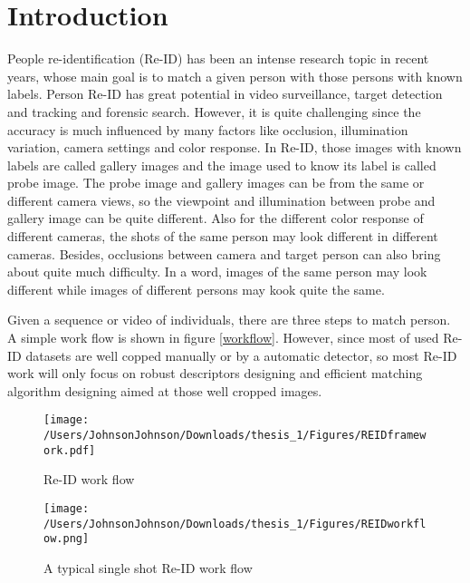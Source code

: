 \chapter{Introduction}

People re-identification (Re-ID) has been an intense research topic in recent years, whose main goal is to match a given person with those persons with known labels. Person Re-ID has great potential in video surveillance, target detection and tracking and forensic search. However, it is quite challenging since the accuracy is much influenced by many factors like occlusion, illumination variation, camera settings and color response. In Re-ID, those images with known labels are called gallery images and the image used to know its label is called probe image. The probe image and gallery images can be from the same or different camera views, so the viewpoint and illumination between probe and gallery image can be quite different. Also for the different color response of different cameras, the shots of the same person may look different in different cameras. Besides, occlusions between camera and target person can also bring about quite much difficulty.  In a word, images of the same person may look different while images of different persons may kook quite the same. 

Given a sequence or video of individuals, there are three steps to match person. A simple work flow is shown in figure \ref{workflow}. However, since most of used Re-ID datasets are well copped manually or by a automatic detector, so most Re-ID work will only focus on robust descriptors designing and efficient matching algorithm designing aimed at those well cropped images. 


\begin{figure}[]
\centering
\begin{raggedleft}
\texttt{[image: /Users/JohnsonJohnson/Downloads/thesis\_1/Figures/REIDframework.pdf]}
\vspace{1em}
\caption{Re-ID work flow}
\end{raggedleft}
\end{figure}
\label{workflow}

\begin{figure}[H]
\centering
\texttt{[image: /Users/JohnsonJohnson/Downloads/thesis\_1/Figures/REIDworkflow.png]}
\vspace{1em}
\caption{A typical single shot Re-ID work flow}
\end{figure}




